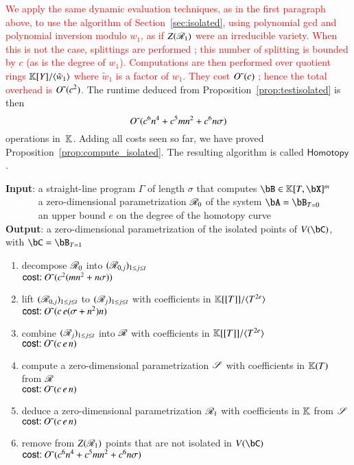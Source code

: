 \documentclass[amsthm]{elsart}
\begin{document}
\textcolor{red}{We apply the same dynamic evaluation techniques, as in the first
  paragraph above, to use the algorithm of Section~\ref{sec:isolated}, using
  polynomial gcd and polynomial inversion modulo $w_1$, as if $Z(\mathscr{R}_1)$ were
  an irreducible variety. When this is not the case, splittings are performed ;
  this number of splitting is bounded by $c$ (as is the degree of $w_1$).
  Computations are then performed over quotient rings $\mathbb{K}[Y] / \langle
  \tilde{w}_1 \rangle$ where $\tilde{w}_1$ is a factor of $w_1$. They cost
  ${O}{\,\tilde{ }\,}(c)$ ; hence the total overhead is ${O}{\,\tilde{ }\,}(c^2)$. } The runtime deduced
from Proposition~\ref{prop:testisolated} is then
$${O}{\,\tilde{ }\,}(c^6 n^4  +  c^5 m n^2  +c^6 n \sigma )$$ operations in~$\mathbb{K}$. Adding all
costs seen so far, we have proved
Proposition~\ref{prop:compute_isolated}. The resulting algorithm
is called $\mathsf{Homotopy}$.




\begin{algorithm}
\caption{$\mathsf{Homotopy}(\Gamma,\scrR_0,e)$}
{\bf Input}: a straight-line program $\Gamma$ of length $\sigma$ that computes $\bB \in \KK[T,\bX]^m$\\
\textcolor{white}{{\bf Input}:} a zero-dimensional parametrization $\mathscr{R}_0$ of the system $\bA=\bB_{T=0}$\\
\textcolor{white}{{\bf Input}:} an upper bound $e$ on the degree of the homotopy curve\\
{\bf Output}: a zero-dimensional parametrization of the isolated points of $V(\bC)$, with $\bC=\bB_{T=1}$
\begin{enumerate}
  \setlength\itemsep{0em}
\item decompose $\mathscr{R}_0$ into $(\mathscr{R}_{0,j})_{1 \leq j \leq t}$\\
$\text{\sf{cost:~}} {O}{\,\tilde{ }\,}(c^2 (mn^2 + n\sigma) )$
\item lift $(\mathscr{R}_{0,j})_{1 \leq j \leq t}$ to $(\mathscr{R}_j)_{1\leq j \leq t}$ with 
  coefficients in $\mathbb{K}[[T]]/\langle T^{2e}\rangle$\\
$\text{\sf{cost:~}} {O}{\,\tilde{ }\,}(c\,e (\sigma+n^2)n)$
\item combine $(\mathscr{R}_j)_{1 \leq j \leq t}$ into  $\mathscr{R}$ with coefficients in $\mathbb{K}[[T]]/\langle T^{2e}\rangle$\\
$\text{\sf{cost:~}} {O}{\,\tilde{ }\,}(c\,e\,n)$
\item compute a zero-dimensional parametrization $\mathscr{S}$ with coefficients in $\mathbb{K}(T)$ from $\mathscr{R}$\\
$\text{\sf{cost:~}} {O}{\,\tilde{ }\,}(c\,e\,n)$
\item deduce a zero-dimensional parametrization $\mathscr{R}_1$ with coefficients in $\mathbb{K}$ from $\mathscr{S}$\\
$\text{\sf{cost:~}} {O}{\,\tilde{ }\,}(c\,e\,n)$
\item\label{step:homot:final} remove from $Z(\mathscr{R}_1)$ points that are not isolated in $V(\bC)$ \\
  $\text{\sf{cost:~}} {O}{\,\tilde{ }\,}(c^6 n^4  + c^5 m n^2   + c^6 n \sigma )$
\end{enumerate}
\label{DetSys}
\end{algorithm}
 
\end{document}
